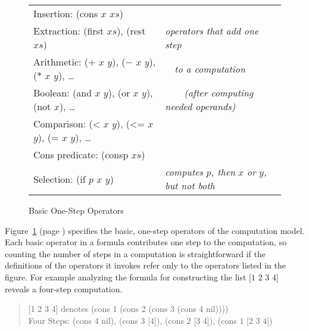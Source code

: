 \begin{figure}
\begin{center}
\begin{tabular}{ll}
Insertion: \textsf{(cons $x$ $xs$)}                                       & \\
Extraction: \textsf{(first $xs$)}, \textsf{(rest $xs$)}                            & \emph{operators that add one step}           \\
Arithmetic: \textsf{($+$ $x$ $y$)}, \textsf{($-$ $x$ $y$)}, \textsf{($*$ $x$ $y$)}, \dots   & ~~\emph{to a computation}                    \\
Boolean: \textsf{(and $x$ $y$)}, \textsf{(or $x$ $y$)}, \textsf{(not $x$)}, \dots       & ~~~~\emph{(after computing needed operands)} \\
Comparison: \textsf{(< $x$ $y$)}, \textsf{(<= $x$ $y$)}, \textsf{(= $x$ $y$)}, \dots  & \\
Cons predicate: \textsf{(consp $xs$)}                                     & \\
Selection: \textsf{(if $p$ $x$ $y$)}                                      & \emph{computes} $p$\emph{, then} $x$ \emph{or} $y$\emph{, but not both}
\end{tabular}
\end{center}
\caption{Basic One-Step Operators}
\label{fig:basic-one-step-ops}
\end{figure}

Figure~\ref{fig:basic-one-step-ops} (page \pageref{fig:basic-one-step-ops})
specifies the basic, one-step operators of
the computation model.
Each basic operator in a formula contributes one step
to the computation, so
counting the number of steps in a computation is straightforward
if the definitions of the operators it invokes refer only
to the operators listed in the figure.
For example analyzing the formula for constructing
the list \textsf{[$1$ $2$ $3$ $4$]} reveals a four-step computation.
\begin{quote}
\textsf{[1 2 3 4]} denotes \textsf{(cons 1 (cons 2 (cons 3 (cons 4 nil))))}\\
Four Steps: \textsf{(cons $4$ nil)}, \textsf{(cons $3$ [$4$])}, \textsf{(cons $2$ [$3$ $4$])}, \textsf{(cons $1$ [$2$ $3$ $4$])}
\end{quote}

